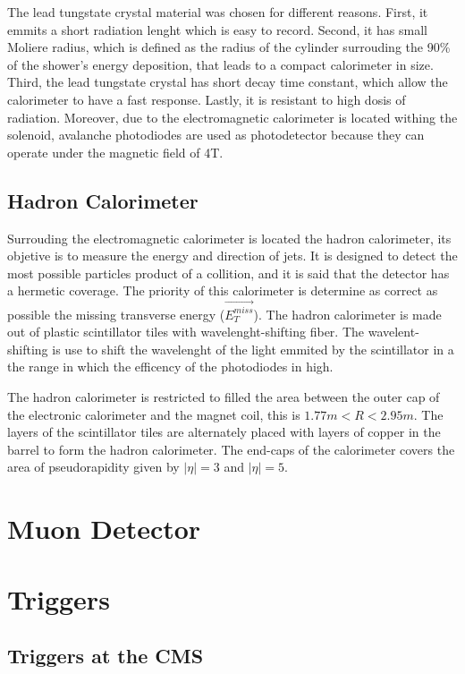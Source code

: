 The lead tungstate crystal material was chosen for different reasons. First, it emmits a short radiation lenght which is easy to record. Second, it has small Moliere radius, which is defined as the radius of the cylinder surrouding the 90\% of the shower's energy deposition, that leads to a compact calorimeter in size. Third, the lead tungstate crystal has short decay time constant, which allow the calorimeter to have a fast response. Lastly, it is resistant to high dosis of radiation. Moreover, due to the electromagnetic calorimeter is located withing the solenoid, avalanche photodiodes are used as photodetector because they can operate under the magnetic field of 4T. 

\subsection{Hadron Calorimeter}

Surrouding the electromagnetic calorimeter is located the hadron calorimeter, its objetive is to measure the energy and direction of jets. It is designed to detect the most possible particles product of a collition, and it is said that the detector has a hermetic coverage. The priority of this calorimeter is determine as correct as possible the missing transverse energy ($\vec{E_T^{miss}}$). The hadron calorimeter is made out of plastic scintillator tiles with wavelenght-shifting fiber. The wavelent-shifting is use to shift the wavelenght of the light emmited by the scintillator in a the range in which the efficency of the photodiodes in high.

The hadron calorimeter is restricted to filled the area between the outer cap of the electronic calorimeter and the magnet coil, this is $1.77 m < R < 2.95m$. The layers of the scintillator tiles are alternately placed with layers of copper in the barrel to form the hadron calorimeter. The end-caps of the calorimeter covers the area of pseudorapidity given by $|\eta|= 3$ and $|\eta|= 5$.


\section{Muon Detector}

\section{Triggers}


\subsection{Triggers at the CMS}






